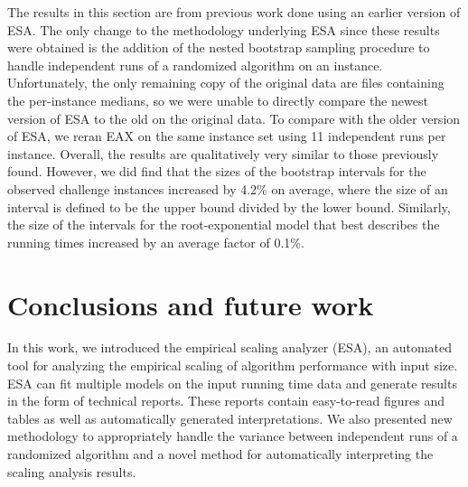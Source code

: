 \documentclass[aic]{iosart2x}
\begin{document}
The results in this section are from previous work done using an earlier version of ESA. The only change to the methodology underlying ESA since these results were obtained is the addition of the nested bootstrap sampling procedure to handle independent runs of a randomized algorithm on an instance.  Unfortunately, the only remaining copy of the original data are files containing the per-instance medians, so we were unable to directly compare the newest version of ESA to the old on the original data. To compare with the older version of ESA, we reran EAX on the same instance set using 11 independent runs per instance. Overall, the results are qualitatively very similar to those previously found. However, we did find that the sizes of the bootstrap intervals for the observed challenge instances increased by 4.2\% on average, where the size of an interval is defined to be the upper bound divided by the lower bound. Similarly, the size of the intervals for the root-exponential model that best describes the running times increased by an average 
factor of 0.1\%. 

\section{Conclusions and future work}
\label{sec:Conclusion}

In this work, we introduced the empirical scaling analyzer (ESA), an automated tool for analyzing the empirical scaling of algorithm performance with input size. ESA can fit multiple models on the input running time data and generate results in the form of technical reports. These reports contain easy-to-read figures and tables as well as automatically generated interpretations. We also presented new methodology to appropriately handle the variance between independent runs of a randomized algorithm and a novel method for automatically interpreting the scaling analysis results.  
\end{document}
